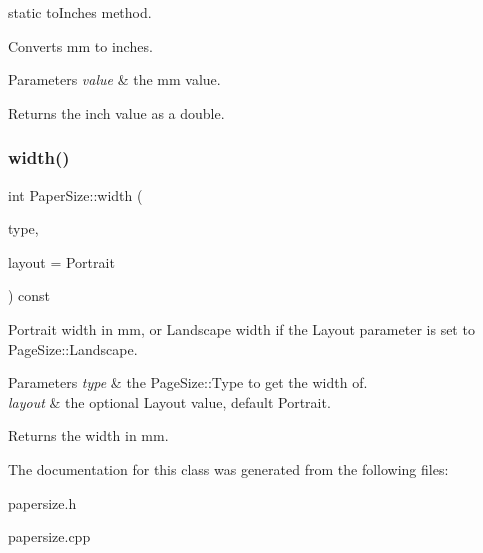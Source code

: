 static {\ttfamily to\+Inches} method. 

Converts mm to inches. 
\begin{DoxyParams}{Parameters}
{\em value} & the mm value. \\
\hline
\end{DoxyParams}
\begin{DoxyReturn}{Returns}
the inch value as a double. 
\end{DoxyReturn}
\mbox{\label{classPaperSize_ac19b82ac30b91bc4223a333a2631f65e}} 
\subsubsection{\texorpdfstring{width()}{width()}}
{\footnotesize\ttfamily int Paper\+Size\+::width (\begin{DoxyParamCaption}\item[{const \mbox{\hyperlink{classPaperSize_a0c3744aab15a171ac1681788f7169ed8}{Type}}}]{type,  }\item[{Layout}]{layout = {\ttfamily Portrait} }\end{DoxyParamCaption}) const}



Portrait width in mm, or Landscape width if the {\ttfamily Layout} parameter is set to {\ttfamily Page\+Size\+::\+Landscape}. 


\begin{DoxyParams}{Parameters}
{\em type} & the Page\+Size\+::\+Type to get the width of. \\
\hline
{\em layout} & the optional Layout value, default Portrait. \\
\hline
\end{DoxyParams}
\begin{DoxyReturn}{Returns}
the width in mm. 
\end{DoxyReturn}


The documentation for this class was generated from the following files\+:\begin{DoxyCompactItemize}
\item 
papersize.\+h\item 
papersize.\+cpp\end{DoxyCompactItemize}
